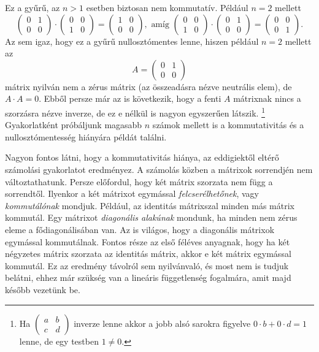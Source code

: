 \documentclass[9pt, showtrims]{memoir}
\theoremstyle{plain}
\theoremstyle{remark}
\theoremstyle{definition}
\begin{document}
Ez a gyűrű, az $n>1$ esetben biztosan nem kommutatív. 
Például $n=2$ mellett
\[
    \begin{pmatrix}
        0&1\\
        0&0
    \end{pmatrix}
    \cdot
    \begin{pmatrix}
        0&0\\
        1&0
    \end{pmatrix}
    =
    \begin{pmatrix}
        1&0\\
        0&0
    \end{pmatrix},
    \text{ amíg }
    \begin{pmatrix}
        0&0\\
        1&0
    \end{pmatrix}
    \cdot
    \begin{pmatrix}
        0&1\\
        0&0
    \end{pmatrix}
    =
    \begin{pmatrix}
        0&0\\
        0&1
    \end{pmatrix}.
\]
Az sem igaz, hogy ez a gyűrű nullosztómentes lenne, hiszen például $n=2$ mellett az
\[
    A
    =
    \begin{pmatrix}
        0&1\\
        0&0
    \end{pmatrix}
\]
mátrix nyilván nem a zérus mátrix (az összeadásra nézve neutrális elem), 
de $A\cdot A=0$. 
Ebből persze már az is következik, hogy a fenti $A$ mátrixnak nincs a szorzásra nézve inverze,
de ez e nélkül is nagyon egyszerűen látszik.%
\footnote{
    Ha 
    \(
        \begin{pmatrix}
            a&b\\
            c&d
        \end{pmatrix}
    \)
    inverze lenne akkor a jobb alsó sarokra figyelve $0\cdot b +0\cdot d=1$ lenne, de egy testben $1\neq 0$.
}
Gyakorlatként próbáljunk magasabb $n$ számok mellett is a kommutativitás és a nullosztómentesség hiányára 
példát találni.

Nagyon fontos látni, hogy a kommutativitás hiánya, az eddigiektől eltérő számolási gyakorlatot eredményez.
A számolás közben a mátrixok sorrendjén nem változtathatunk. 
Persze előfordul, hogy két mátrix szorzata nem függ a sorrendtől. 
Ilyenkor a két mátrixot egymással \emph{felcserélhetőnek}, vagy \emph{kommutálónak} mondjuk.
Például, az identitás mátrixszal minden más mátrix kommutál.
Egy mátrixot \emph{diagonális alakúnak} mondunk, 
ha minden nem zérus eleme a fődiagonálisában van.
Az is világos, hogy a diagonális mátrixok egymással kommutálnak.
Fontos része az első féléves anyagnak, hogy ha két négyzetes mátrix szorzata az identitás mátrix,
akkor e két mátrix egymással kommutál.
Ez az eredmény távolról sem nyilvánvaló, és most nem is tudjuk belátni, ehhez már szükség van a lineáris függetlenség fogalmára, amit majd később vezetünk be.
\end{document}
